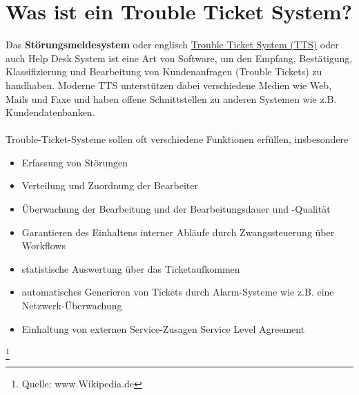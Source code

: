 \section{Was ist ein Trouble Ticket System?}
\label{section:Was ist ein Trouble Ticket System?}
Das \textbf{Störungsmeldesystem} oder englisch \underline{Trouble Ticket System (TTS)} oder auch Help Desk System ist eine Art von Software, um den Empfang, Bestätigung, Klassifizierung und Bearbeitung von Kundenanfragen (Trouble Tickets) zu handhaben. Moderne TTS unterstützen dabei verschiedene Medien wie Web, Mails und Faxe und haben offene Schnittstellen zu anderen Systemen wie z.B. Kundendatenbanken.\\
\\
Trouble-Ticket-Systeme sollen oft verschiedene Funktionen erfüllen, insbesondere\\
\begin{itemize}
\item Erfassung von Störungen
\item Verteilung und Zuordnung der Bearbeiter
\item Überwachung der Bearbeitung und der Bearbeitungsdauer und -Qualität
\item Garantieren des Einhaltens interner Abläufe durch Zwangssteuerung über Workflows
\item statistische Auswertung über das Ticketaufkommen
\item automatisches Generieren von Tickets durch Alarm-Systeme wie z.B. eine Netzwerk-Überwachung
\item Einhaltung von externen Service-Zusagen Service Level Agreement
\end{itemize}
\footnote[1]{Quelle: www.Wikipedia.de}
